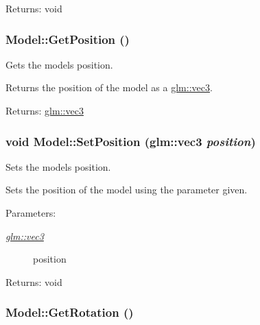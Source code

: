 \begin{Desc}
\item[Returns:]void \end{Desc}
\hypertarget{class_model_5fe059a355fdb0531110696dafcec43b}{
\subsubsection[GetPosition]{ Model::GetPosition ()}}
\label{class_model_5fe059a355fdb0531110696dafcec43b}


Gets the models position. 

Returns the position of the model as a \hyperlink{group__core__types_g1c47e8b3386109bc992b6c48e91b0be7}{glm::vec3}.

\begin{Desc}
\item[Returns:]\hyperlink{group__core__types_g1c47e8b3386109bc992b6c48e91b0be7}{glm::vec3} \end{Desc}
\hypertarget{class_model_3a615a604e26270bd0849462718703b2}{
\subsubsection[SetPosition]{\setlength{\rightskip}{0pt plus 5cm}void Model::SetPosition ({\bf glm::vec3} {\em position})}}
\label{class_model_3a615a604e26270bd0849462718703b2}


Sets the models position. 

Sets the position of the model using the parameter given.

\begin{Desc}
\item[Parameters:]
\begin{description}
\item[{\em \hyperlink{group__core__types_g1c47e8b3386109bc992b6c48e91b0be7}{glm::vec3}}]position \end{description}
\end{Desc}
\begin{Desc}
\item[Returns:]void \end{Desc}
\hypertarget{class_model_4000e7bcd78069bc4584da37d2bf3d66}{
\subsubsection[GetRotation]{ Model::GetRotation ()}}
\label{class_model_4000e7bcd78069bc4584da37d2bf3d66}


